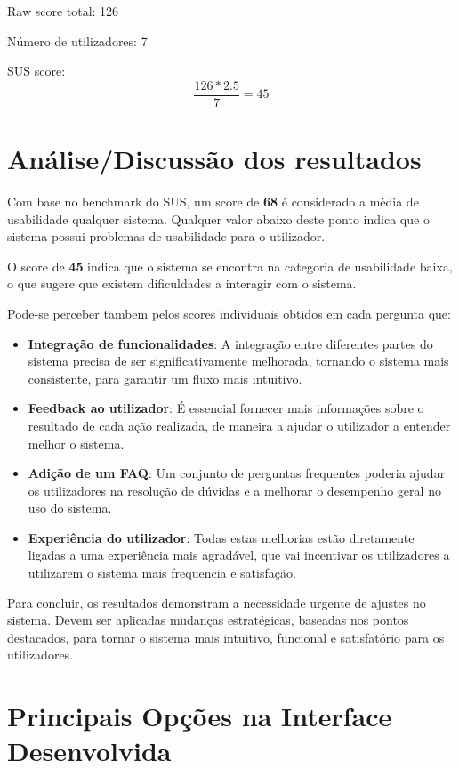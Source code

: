 \documentclass[a4paper,12pt]{article}
\begin{document}
Raw score total: 126
\vspace{0.2cm}

Número de utilizadores: 7
\vspace{0.4cm}

SUS score: \[\frac{126 * 2.5}{7} = 45\]

\newpage
\section{Análise/Discussão dos resultados}

Com base no benchmark do SUS, um score de \textbf{68} é considerado a média de usabilidade qualquer sistema. Qualquer valor abaixo deste ponto indica que o sistema possui problemas de usabilidade para o utilizador.

O score de \textbf{45} indica que o sistema se encontra na categoria de usabilidade baixa, o que sugere que existem dificuldades a interagir com o sistema.
\vspace{0.2cm}

Pode-se perceber tambem pelos scores individuais obtidos em cada pergunta que:
\begin{itemize}
    \item \textbf{Integração de funcionalidades}: A integração entre diferentes partes do sistema precisa de ser significativamente melhorada, tornando o sistema mais consistente, para garantir um fluxo mais intuitivo.
    \item \textbf{Feedback ao utilizador}: É essencial fornecer mais informações sobre o resultado de cada ação realizada, de maneira a ajudar o utilizador a entender melhor o sistema.
    \item \textbf{Adição de um FAQ}: Um conjunto de perguntas frequentes poderia ajudar os utilizadores na resolução de dúvidas e a melhorar o desempenho geral no uso do sistema.
    \item \textbf{Experiência do utilizador}: Todas estas melhorias estão diretamente ligadas a uma experiência mais agradável, que vai incentivar os utilizadores a utilizarem o sistema mais frequencia e satisfação.
\end{itemize}

Para concluir, os resultados demonstram a necessidade urgente de ajustes no sistema. Devem ser aplicadas mudanças estratégicas, baseadas nos pontos destacados, para tornar o sistema mais intuitivo, funcional e satisfatório para os utilizadores.

\newpage
\section{Principais Opções na Interface Desenvolvida}
\end{document}
